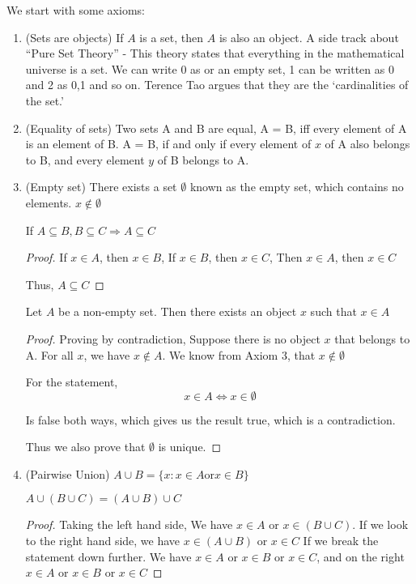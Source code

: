 \documentclass[11pt]{report}
\begin{document}
We start with some axioms:
\begin{enumerate}
	\item (Sets are objects) If $A$ is a set, then $A$ is also an object.
	      A side track about ``Pure Set Theory'' - This theory states that everything in the mathematical universe is a set. We can write 0 as {} or an empty set, 1 can be written as {0} and 2 as {0,1} and so on. Terence Tao argues that they are the `cardinalities of the set.'
	\item (Equality of sets) Two sets A and B are equal, A = B, iff every element of A is an element of B. A = B, if and only if every element of $x$ of A also belongs to B, and every element $y$ of B belongs to A.
	\item (Empty set) There exists a set $\emptyset$ known as the empty set, which contains no elements. $x \notin \emptyset$
	      \begin{prop}
		      If $A \subseteq B, B \subseteq C \Rightarrow A \subseteq C$
	      \end{prop}
	      \begin{proof}
		      If $x \in A$, then $x \in B$,
		      If $x \in B$, then $x \in C$,
		      Then $x \in A$, then $x \in C$

		      Thus, $A \subseteq C$
	      \end{proof}
	      \begin{lemma}
		      Let $A$ be a non-empty set. Then there exists an object $x$ such that $x \in A$
	      \end{lemma}
	      \begin{proof}
		      Proving by contradiction,
		      Suppose there is no object $x$ that belongs to A. For all $x$, we have $x \notin A$. We know from Axiom 3, that $x \notin \emptyset$

		      For the statement,
		      $$ x \in A \Leftrightarrow x \in \emptyset $$

		      Is false both ways, which gives us the result true, which is a contradiction.

		      Thus we also prove that $\emptyset$ is unique.
	      \end{proof}
	\item (Pairwise Union) $A \cup B = \{x : x \in A \text{or} x \in B\}$
	      \begin{lemma}
		      $A \cup (B \cup C) = (A \cup B) \cup C$
	      \end{lemma}
	      \begin{proof}
		      Taking the left hand side,
		      We have $x \in A$ or $x \in (B \cup C)$. If we look to the right hand side, we have $x \in (A \cup B)$ or $ x \in C$
		      If we break the statement down further.
		      We have $x \in A$ or $x \in B$ or $x \in C$, and  on the right $x \in A$ or $x \in B$ or $x\in C$


\end{proof}
\end{enumerate}
\end{document}
